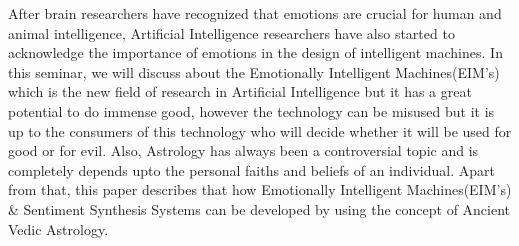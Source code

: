 After brain researchers have recognized that emotions are crucial for human and animal intelligence, Artificial Intelligence researchers have also started to acknowledge the importance of emotions in the design of intelligent machines. In this seminar, we will discuss about the Emotionally Intelligent Machines(EIM's) which is the new field of research in Artificial Intelligence but it has a great potential to do immense good, however the technology can be misused but it is up to the consumers of this technology who will decide whether it will be used for good or for evil. Also, Astrology has always been a controversial topic and is completely depends upto the personal faiths and beliefs of an individual. Apart from that, this paper describes that how Emotionally Intelligent Machines(EIM's) \& Sentiment Synthesis Systems can be developed by using the concept of Ancient Vedic Astrology.